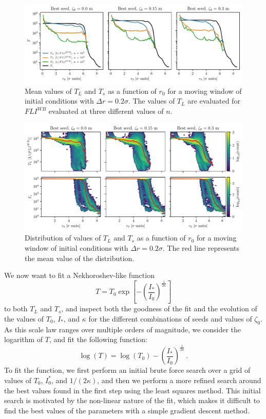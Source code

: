 \begin{figure}
    \centering
    \includegraphics[width=1\textwidth]{6_lhc_dynamic_indicators/figs/lyapunov_time_vs_radius.pdf}
    \caption{Mean values of $T_L$ and $T_s$ as a function of $r_0$ for a moving window of initial conditions with $\Delta r = 0.2\sigma$. The values of $T_L$ are evaluated for $FLI^{{WB}}$ evaluated at three different values of $n$.}
    \label{fig:ts_vs_tl}
\end{figure}

\begin{figure}
    \centering
    \includegraphics[width=1\textwidth]{6_lhc_dynamic_indicators/figs/dist_and_mean.pdf}
    \caption{Distribution of values of $T_L$ and $T_s$ as a function of $r_0$ for a moving window of initial conditions with $\Delta r = 0.2\sigma$. The red line represents the mean value of the distribution.}
    \label{fig:extra_distribution}
\end{figure}

We now want to fit a Nekhoroshev-like function
\begin{equation}
    T = T_0 \exp\left[-\left(\frac{I_\ast}{I_0}\right)^{\frac{1}{2\kappa}}\right]
\end{equation} 
to both $T_L$ and $T_s$, and inspect both the goodness of the fit and the evolution of the values of $T_0$, $I_\ast$, and $\kappa$ for the different combinations of seeds and values of $\zeta_0$. As this scale law ranges over multiple orders of magnitude, we consider the logarithm of $T$, and fit the following function:
\begin{equation}
    \log(T) = \log(T_0) - \left(\frac{I_\ast}{I_0}\right)^{\frac{1}{2\kappa}} \,.
\end{equation}
To fit the function, we first perform an initial brute force search over a grid of values of $T_0$, $I_0^*$, and $1/(2\kappa)$, and then we perform a more refined search around the best values found in the first step using the least squares method. This initial search is motivated by the non-linear nature of the fit, which makes it difficult to find the best values of the parameters with a simple gradient descent method.

